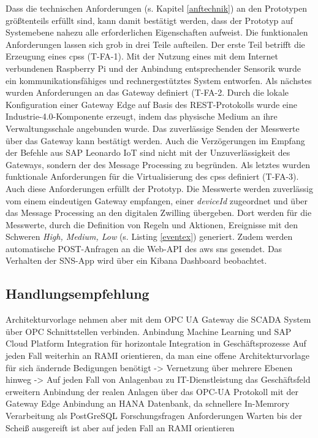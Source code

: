 Dass die technischen Anforderungen (s. Kapitel \ref{anftechnik}) an den Prototypen größtenteils erfüllt sind, kann damit bestätigt werden, dass der Prototyp auf Systemebene nahezu alle erforderlichen Eigenschaften aufweist. Die funktionalen Anforderungen lassen sich grob in drei Teile aufteilen. Der erste Teil betrifft die Erzeugung eines \ac{cpss} (T-FA-1). Mit der Nutzung eines mit dem Internet verbundenen Raspberry Pi und der Anbindung entsprechender Sensorik wurde ein kommunikationsfähiges und rechnergestütztes System entworfen. Als nächstes wurden Anforderungen an das Gateway definiert  (T-FA-2. Durch die lokale Konfiguration einer Gateway Edge auf Basis des REST-Protokolls wurde eine Industrie-4.0-Komponente erzeugt, indem das physische Medium an ihre Verwaltungsschale angebunden wurde. Das zuverlässige Senden der Messwerte über das Gateway kann bestätigt werden. Auch die Verzögerungen im Empfang der Befehle aus SAP Leonardo IoT sind nicht mit der Unzuverlässigkeit des Gateways, sondern der des Message Processing zu begründen. Als letztes wurden funktionale Anforderungen für die Virtualisierung des \ac{cpss} definiert (T-FA-3). Auch diese Anforderungen erfüllt der Prototyp. Die Messwerte werden zuverlässig vom einem eindeutigen Gateway empfangen, einer \textit{deviceId} zugeordnet und über das Message Processing an den digitalen Zwilling übergeben. Dort werden für die Messwerte, durch die Definition von Regeln und Aktionen, Ereignisse mit den Schweren \textit{High, Medium, Low} (s. Listing \ref{eventex}) generiert. Zudem werden automatische POST-Anfragen an die Web-API des \ac{aws} \ac{sns} gesendet. Das Verhalten der SNS-App wird über ein Kibana Dashboard beobachtet.  

\subsection{Handlungsempfehlung}


Architekturvorlage nehmen aber mit dem OPC UA Gateway die SCADA System über OPC Schnittstellen verbinden.
Anbindung Machine Learning
und SAP Cloud Platform Integration für horizontale Integration in Geschäftsprozesse
Auf jeden Fall weiterhin an RAMI orientieren, da man eine offene Architekturvorlage für sich ändernde Bedigungen benötigt -> Vernetzung über mehrere Ebenen hinweg
-> Auf jeden Fall von Anlagenbau zu IT-Dienstleistung das Geschäftsfeld erweitern 
Anbindung der realen Anlagen über das OPC-UA Protokoll mit der Gateway Edge
Anbindung an HANA Datenbank, da schnellere In-Memrory Verarbeitung als PostGreSQL
Forschungsfragen
Anforderungen
Warten bis der Scheiß ausgereift ist aber auf jeden Fall an RAMI orientieren


